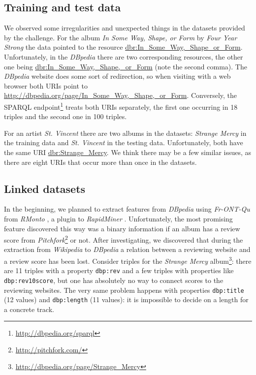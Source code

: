 \documentclass{llncs}
\begin{document}
\subsection{Training and test data}
We observed some irregularities and unexpected things in the datasets provided by the challenge.
For the album \emph{In Some Way, Shape, or Form} by \emph{Four Year Strong} the data pointed to the resource \url{dbr:In_Some_Way,_Shape_or_Form}.
Unfortunately, in the \emph{DBpedia} \cite{dbpedia} there are two corresponding resources, the other one being \url{dbr:In_Some_Way,_Shape,_or_Form} (note the second comma).
The \emph{DBpedia} website does some sort of redirection, so when visiting with a web browser both URIs point to \url{http://dbpedia.org/page/In_Some_Way,_Shape,_or_Form}.
Conversely, the SPARQL endpoint\footnote{\url{http://dbpedia.org/sparql}} treats both URIs separately, the first one occurring in 18 triples and the second one in 100 triples.

For an artist \emph{St. Vincent} there are two albums in the datasets: \emph{Strange Mercy} in the training data and \emph{St. Vincent} in the testing data.
Unfortunately, both have the same URI \url{dbr:Strange_Mercy}.
We think there may be a few similar issues, as there are eight URIs that occur more than once in the datasets.
%

\subsection{Linked datasets\label{sec:ld}}
In the beginning, we planned to extract features from \emph{DBpedia} using \emph{Fr-ONT-Qu} \cite{frontqu} from \emph{RMonto} \cite{rmonto}, a plugin to \emph{RapidMiner} \cite{rapidminer}.
Unfortunately, the most promising feature discovered this way was a binary information if an album has a review score from \emph{Pitchfork}\footnote{\url{http://pitchfork.com/}} or not.
After investigating, we discovered that during the extraction from \emph{Wikipedia} to \emph{DBpedia} a relation between a reviewing website and a review score has been lost.
Consider triples for the \emph{Strange Mercy} album\footnote{\url{http://dbpedia.org/page/Strange_Mercy}}: there are 11 triples with a property \texttt{dbp:rev} and a few triples with properties like \texttt{dbp:rev10score}, but one has absolutely no way to connect scores to the reviewing websites.
The very same problem happens with properties \texttt{dbp:title} (12 values) and \texttt{dbp:length} (11 values): it is impossible to decide on a length for a concrete track.
\end{document}
